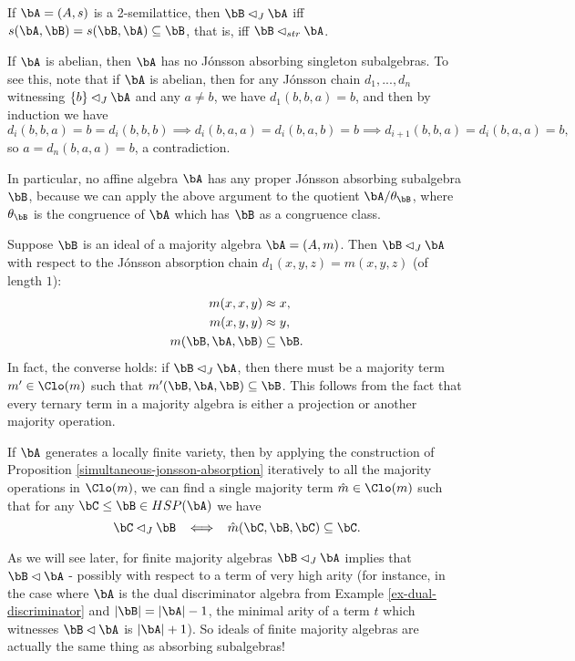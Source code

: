 \begin{ex} If $\bA = (A,s)$ is a 2-semilattice, then $\bB \lhd_J \bA$ iff $s(\bA,\bB) = s(\bB,\bA) \subseteq \bB$, that is, iff $\bB \lhd_{str} \bA$.
\end{ex}

\begin{ex} If $\bA$ is abelian, then $\bA$ has no J\'onsson absorbing singleton subalgebras. To see this, note that if $\bA$ is abelian, then for any J\'onsson chain $d_1, ..., d_n$ witnessing $\{b\} \lhd_J \bA$ and any $a \ne b$, we have $d_1(b,b,a) = b$, and then by induction we have
\[
d_i(b,\boxed{b},a) = b = d_i(b,\boxed{b},b) \implies d_i(b,\boxed{a},a) = d_i(b,\boxed{a},b) = b \implies d_{i+1}(b,b,a) = d_i(b,a,a) = b,
\]
so $a = d_n(b,a,a) = b$, a contradiction.

In particular, no affine algebra $\bA$ has any proper J\'onsson absorbing subalgebra $\bB$, because we can apply the above argument to the quotient $\bA/\theta_\bB$, where $\theta_\bB$ is the congruence of $\bA$ which has $\bB$ as a congruence class.
\end{ex}

\begin{ex} Suppose $\bB$ is an ideal of a majority algebra $\bA = (A,m)$. Then $\bB \lhd_J \bA$ with respect to the J\'onsson absorption chain $d_1(x,y,z) = m(x,y,z)$ (of length $1$):
\begin{align*}
m(x,x,y) &\approx x,\\
m(x,y,y) &\approx y,\\
m(\bB,\bA,\bB) &\subseteq \bB.
\end{align*}
In fact, the converse holds: if $\bB \lhd_J \bA$, then there must be a majority term $m' \in \Clo(m)$ such that $m'(\bB,\bA,\bB) \subseteq \bB$. This follows from the fact that every ternary term in a majority algebra is either a projection or another majority operation.

If $\bA$ generates a locally finite variety, then by applying the construction of Proposition \ref{simultaneous-jonsson-absorption} iteratively to all the majority operations in $\Clo(m)$, we can find a single majority term $\hat{m} \in \Clo(m)$ such that for any $\bC \le \bB \in HSP(\bA)$ we have
\[
\bC \lhd_J \bB \;\; \iff \;\; \hat{m}(\bC,\bB,\bC) \subseteq \bC.
\]

As we will see later, for finite majority algebras $\bB \lhd_J \bA$ implies that $\bB \lhd \bA$ - possibly with respect to a term of very high arity (for instance, in the case where $\bA$ is the dual discriminator algebra from Example \ref{ex-dual-discriminator} and $|\bB| = |\bA|-1$, the minimal arity of a term $t$ which witnesses $\bB \lhd \bA$ is $|\bA| + 1$). So ideals of finite majority algebras are actually the same thing as absorbing subalgebras!
\end{ex}

